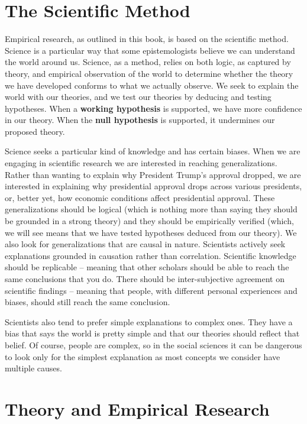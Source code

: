 \documentclass[11pt,openany]{book}\usepackage[]{graphicx}\usepackage[]{color}
\begin{document}
\section{The Scientific Method}

Empirical research, as outlined in this book, is based on the scientific method. Science is a particular way that some  epistemologists believe we can understand the world around us. Science, as a method, relies on both logic, as  captured by theory, and empirical observation of the world to determine whether the theory we have developed  conforms to what we actually observe. We seek to explain the world with our theories, and we test our theories by  deducing and testing hypotheses. When a \textbf{working hypothesis} is supported, we have more confidence in our theory. When the \textbf{null hypothesis} is supported, it undermines our proposed theory.

Science seeks a particular kind of knowledge and has certain biases. When we are engaging in scientific research  we are interested in reaching generalizations. Rather than wanting to explain why President Trump's approval dropped,  we are interested in explaining why presidential approval drops across various presidents, or, better yet, how economic  conditions affect presidential approval. These generalizations should be logical (which is nothing more than saying they  should be grounded in a strong theory) and they should be empirically verified (which, we will see means that we have  tested hypotheses deduced from our theory). We also look for generalizations that are causal in nature. Scientists actively seek explanations grounded in causation rather than correlation. Scientific knowledge should be replicable -- meaning that other scholars should be able to reach the same conclusions that you do. There should be inter-subjective agreement on scientific findings -- meaning that people, with different personal experiences and biases, should still reach the same conclusion.

Scientists also tend to prefer simple explanations to complex ones. They have a bias that says the world is pretty simple and that our theories should reflect that belief. Of course, people are complex, so in the social sciences it can be dangerous to look only for the simplest explanation as most concepts we consider have multiple causes.

\section{Theory and Empirical Research}
\end{document}
